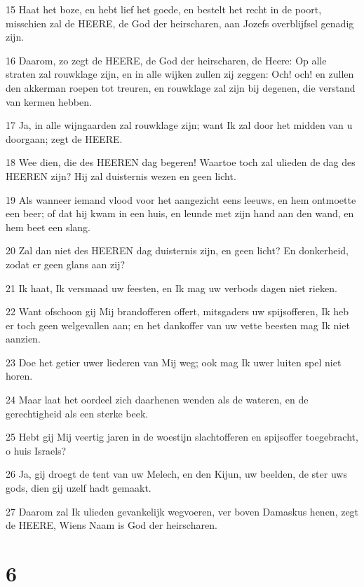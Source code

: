 \par 15 Haat het boze, en hebt lief het goede, en bestelt het recht in de poort, misschien zal de HEERE, de God der heirscharen, aan Jozefs overblijfsel genadig zijn.
\par 16 Daarom, zo zegt de HEERE, de God der heirscharen, de Heere: Op alle straten zal rouwklage zijn, en in alle wijken zullen zij zeggen: Och! och! en zullen den akkerman roepen tot treuren, en rouwklage zal zijn bij degenen, die verstand van kermen hebben.
\par 17 Ja, in alle wijngaarden zal rouwklage zijn; want Ik zal door het midden van u doorgaan; zegt de HEERE.
\par 18 Wee dien, die des HEEREN dag begeren! Waartoe toch zal ulieden de dag des HEEREN zijn? Hij zal duisternis wezen en geen licht.
\par 19 Als wanneer iemand vlood voor het aangezicht eens leeuws, en hem ontmoette een beer; of dat hij kwam in een huis, en leunde met zijn hand aan den wand, en hem beet een slang.
\par 20 Zal dan niet des HEEREN dag duisternis zijn, en geen licht? En donkerheid, zodat er geen glans aan zij?
\par 21 Ik haat, Ik versmaad uw feesten, en Ik mag uw verbods dagen niet rieken.
\par 22 Want ofschoon gij Mij brandofferen offert, mitsgaders uw spijsofferen, Ik heb er toch geen welgevallen aan; en het dankoffer van uw vette beesten mag Ik niet aanzien.
\par 23 Doe het getier uwer liederen van Mij weg; ook mag Ik uwer luiten spel niet horen.
\par 24 Maar laat het oordeel zich daarhenen wenden als de wateren, en de gerechtigheid als een sterke beek.
\par 25 Hebt gij Mij veertig jaren in de woestijn slachtofferen en spijsoffer toegebracht, o huis Israels?
\par 26 Ja, gij droegt de tent van uw Melech, en den Kijun, uw beelden, de ster uws gods, dien gij uzelf hadt gemaakt.
\par 27 Daarom zal Ik ulieden gevankelijk wegvoeren, ver boven Damaskus henen, zegt de HEERE, Wiens Naam is God der heirscharen.

\chapter{6}

